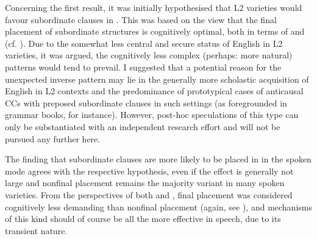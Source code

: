 \begin{sloppypar}
Concerning the first result, it was initially hypothesised that L2 varieties would favour subordinate clauses in . This was based on the view that the final placement of subordinate structures is cognitively optimal, both in terms of  and  (cf. ). Due to the somewhat less central and secure status of English in L2 varieties, it was argued, the cognitively less complex (perhaps: more natural) patterns would tend to prevail. I suggested that a potential reason for the unexpected inverse pattern may lie in the generally more scholastic acquisition of English in L2 contexts and the predominance of prototypical cases of anticausal CCs with preposed subordinate clauses in such settings (as foregrounded in grammar books, for instance). However, post-hoc speculations of this type can only be substantiated with an independent research effort and will not be pursued any further here.
\end{sloppypar}

The finding that subordinate clauses are more likely to be placed in  in the spoken mode agrees with the respective hypothesis, even if the effect is generally not large and nonfinal placement remains the majority variant in many spoken varieties. From the perspectives of both  and , final placement was considered cognitively less demanding than nonfinal placement (again, see ), and mechanisms of this kind should of course be all the more effective in speech, due to its transient nature.

